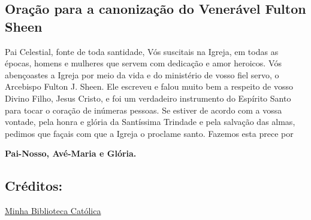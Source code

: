 \documentclass[11pt]{article}
\begin{document}
\textbf{}

\subsection{Oração para a canonização do Venerável Fulton Sheen} \label{oracao-canonizacao}

Pai Celestial, fonte de toda santidade, Vós suscitais na Igreja, em todas as épocas, homens e mulheres que servem com dedicação e amor heroicos. Vós abençoastes a Igreja por meio da vida e do ministério de vosso fiel servo, o Arcebispo Fulton J. Sheen. Ele escreveu e falou muito bem a respeito de vosso Divino Filho, Jesus Cristo, e foi um verdadeiro instrumento do Espírito Santo para tocar o coração de inúmeras pessoas. Se estiver de acordo com a vossa vontade, pela honra e glória da Santíssima Trindade e pela salvação das almas, pedimos que façais com que a Igreja o proclame santo. Fazemos esta prece por

\textbf{Pai-Nosso, Avé-Maria e Glória.}

\subsection*{Créditos:}
\href{https://bibliotecacatolica.com.br/blog/novenas/novena-de-fulton-sheen/}{Minha Biblioteca Católica}
\end{document}
